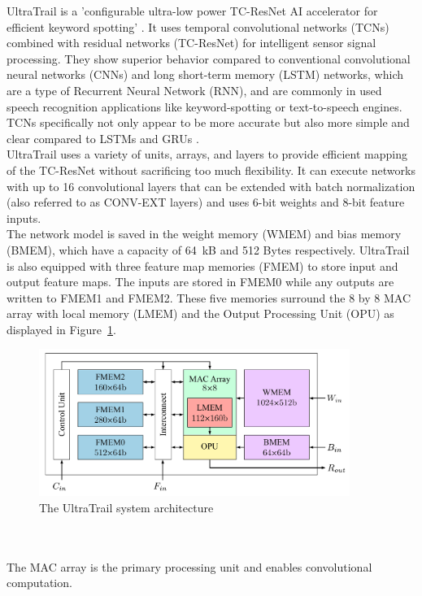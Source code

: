 UltraTrail is a 'configurable ultra-low power TC-ResNet AI accelerator for efficient keyword spotting' \cite{ultratrail}.
It uses temporal convolutional networks (TCNs) combined with residual networks (TC-ResNet) for intelligent sensor signal processing.
They show superior behavior compared to conventional convolutional neural networks (CNNs) and long short-term memory (LSTM) networks,
which are a type of Recurrent Neural Network (RNN), and are commonly in used speech recognition applications like keyword-spotting or text-to-speech engines.
TCNs specifically not only appear to be more accurate but also more simple and clear compared to LSTMs and GRUs \cite[Ch I]{ultratrail}.\\
UltraTrail uses a variety of units, arrays, and layers to provide efficient mapping of the TC-ResNet without sacrificing too much flexibility.
It can execute networks with up to 16 convolutional layers that can be extended with batch normalization (also referred to as CONV-EXT layers)
and uses 6-bit weights and 8-bit feature inputs.\\
The network model is saved in the weight memory (WMEM) and bias memory (BMEM), which
have a capacity of 64 kB and 512 Bytes respectively.
UltraTrail is also equipped with three feature map memories (FMEM) to store input and output
feature maps. The inputs are stored in FMEM0 while any outputs are written to FMEM1 and FMEM2.
These five memories surround the 8 by 8 MAC array with local memory (LMEM) and the Output Processing Unit (OPU) as displayed in Figure~\ref{fig:ultratrail_arch}.
\begin{figure}[htb]
    \centering
    \includegraphics[width=0.9\textwidth]{figures/ultratrail.png}
    \caption[Illustration: The UltraTrail system architecture (Fig. 5)\cite{ultratrail}]{The UltraTrail system architecture}
    \label{fig:ultratrail_arch}
\end{figure}
\\\\
The MAC array is the primary processing unit and enables convolutional computation.

